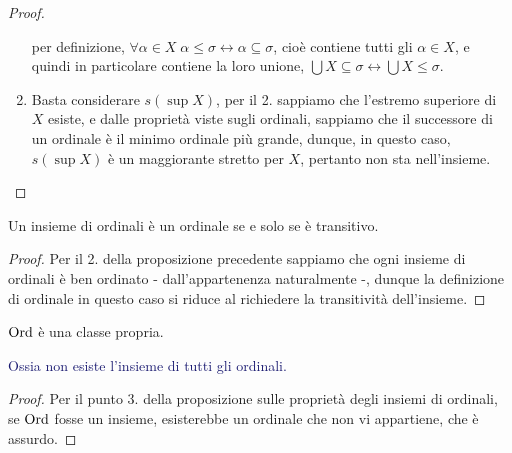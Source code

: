 \begin{proof}
\begin{enumerate}[1.]
		per definizione, $\forall \alpha \in X \; \alpha \leq \sigma \leftrightarrow \alpha \subseteq \sigma$, cioè contiene tutti gli $\alpha \in X$, e quindi in particolare contiene la loro unione, $\bigcup X \subseteq \sigma \leftrightarrow \bigcup X \leq \sigma$.
		\item Basta considerare $s(\sup X)$, per il 2. sappiamo che l'estremo superiore di $X$ esiste, e dalle proprietà viste sugli ordinali, sappiamo che il successore di un ordinale è il minimo ordinale più grande, dunque, in questo caso, $s(\sup X)$ è un maggiorante stretto per $X$, pertanto non sta nell'insieme.
	\end{enumerate}
\end{proof}

\begin{corollary}
	Un insieme di ordinali è un ordinale se e solo se è transitivo.
\end{corollary}

\begin{proof}
	Per il 2. della proposizione precedente sappiamo che ogni insieme di ordinali è ben ordinato - dall'appartenenza naturalmente -, dunque la definizione di ordinale in questo caso si riduce al richiedere la transitività dell'insieme.
\end{proof}

\begin{corollary}
	$\operatorname{Ord}$ è una classe propria.
\end{corollary}

\textcolor{MidnightBlue}{Ossia non esiste l'insieme di tutti gli ordinali.}

\begin{proof}
	Per il punto 3. della proposizione sulle proprietà degli insiemi di ordinali, se $\operatorname{Ord}$ fosse un insieme, esisterebbe un ordinale che non vi appartiene, che è assurdo.
\end{proof}

